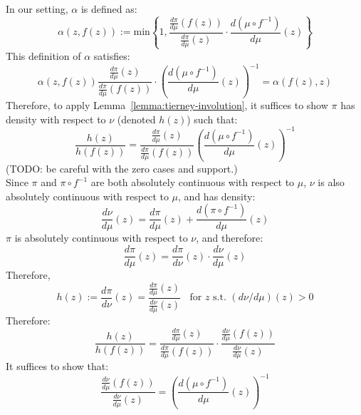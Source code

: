 \documentclass[twoside]{article}
\begin{document}
In our setting, $\alpha$ is defined as:
\begin{equation}
\alpha(z, f(z)) := \mbox{min}\left\{1, \frac{\frac{d \pi}{d \mu}(f(z))}{\frac{d \pi}{d \mu}(z)} \cdot \frac{d (\mu \circ f^{-1})}{d \mu}(z)\right\}
\end{equation}
This definition of $\alpha$ satisfies:
\begin{equation}
\alpha(z, f(z)) \frac{\frac{d \pi}{d \mu}(z)}{\frac{d \pi}{d \mu}(f(z))} \cdot \left( \frac{d (\mu \circ f^{-1})}{d \mu} (z)\right)^{-1}= \alpha(f(z), z)
\end{equation}
Therefore, to apply Lemma~\ref{lemma:tierney-involution}, it suffices to show $\pi$ has density with respect to $\nu$ (denoted $h(z)$) such that:
\begin{equation}
\frac{h(z)}{h(f(z))} = \frac{\frac{d \pi}{d \mu}(z)}{\frac{d \pi}{d \mu}(f(z))} \left( \frac{d (\mu \circ f^{-1})}{d \mu} (z)\right)^{-1}
\end{equation}
(TODO: be careful with the zero cases and support.)\\ %
Since $\pi$ and $\pi \circ f^{-1}$ are both absolutely continuous with respect to $\mu$, $\nu$ is also absolutely continuous with respect to $\mu$, and has density:
\begin{equation}
\frac{d \nu}{d \mu}(z) = \frac{d \pi}{d \mu}(z) + \frac{d (\pi \circ f^{-1})}{d \mu}(z) 
\end{equation}
$\pi$ is absolutely continuous with respect to $\nu$, and therefore:
\begin{equation}
\frac{d \pi}{d \mu}(z) = \frac{d \pi}{d \nu}(z) \cdot \frac{d \nu}{d \mu}(z)
\end{equation}
Therefore,
\begin{equation}
h(z)
:= \frac{d \pi}{d \nu}(z)
= \frac{\frac{d \pi}{d \mu}(z)}{\frac{d \nu}{d \mu}(z)}
\;\; \mbox{ for } z \mbox{ s.t. } (d \nu / d \mu)(z) > 0
\end{equation}
Therefore:%
\begin{equation}
\frac{h(z)}{h(f(z))} = \frac{\frac{d \pi}{d \mu}(z)}{\frac{d \pi}{d \mu}(f(z))} \cdot \frac{\frac{d \nu}{d \mu}(f(z))}{\frac{d \nu}{d \mu}(z)}
\end{equation}
It suffices to show that:
\[
\frac{\frac{d \nu}{d \mu}(f(z))}{\frac{d \nu}{d \mu}(z)} = \left(\frac{d (\mu \circ f^{-1})}{d \mu}(z)\right)^{-1}
\]
\end{document}
